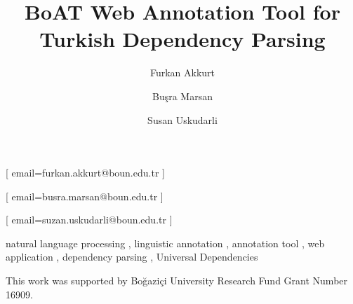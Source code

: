 \documentclass[
]{ceurart}
\begin{document}


\title{BoAT Web Annotation Tool for Turkish Dependency Parsing}

\author[1]{Furkan Akkurt}[%
email=furkan.akkurt@boun.edu.tr
]

\author[2]{Buşra Marsan}[%
email=busra.marsan@boun.edu.tr
]

\author[1]{Susan Uskudarli}[%
email=suzan.uskudarli@boun.edu.tr
]

\address[1]{ Department of Computer Engineering, Bogazici University, Istanbul, Turkey }
\address[1]{ Department of Linguistics, Bogazici University, Istanbul, Turkey }



\begin{keywords}
natural language processing \sep
linguistic annotation \sep
annotation tool \sep
web application \sep
dependency parsing \sep
Universal Dependencies
\end{keywords}

\maketitle










\begin{acknowledgments}
This work was supported by Boğaziçi University Research Fund Grant Number 16909.
\end{acknowledgments}


\end{document}
